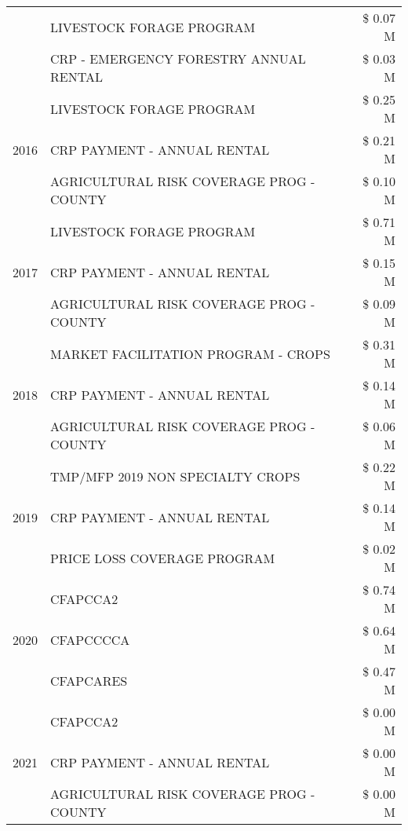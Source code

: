 \begin{tabular}{llr}
 & LIVESTOCK FORAGE PROGRAM & \$ 0.07 M \\
 & CRP - EMERGENCY FORESTRY ANNUAL RENTAL & \$ 0.03 M \\
\cline{1-3}
\multirow[t]{3}{*}{2016} & LIVESTOCK FORAGE PROGRAM & \$ 0.25 M \\
 & CRP PAYMENT - ANNUAL RENTAL & \$ 0.21 M \\
 & AGRICULTURAL RISK COVERAGE PROG - COUNTY & \$ 0.10 M \\
\cline{1-3}
\multirow[t]{3}{*}{2017} & LIVESTOCK FORAGE PROGRAM & \$ 0.71 M \\
 & CRP PAYMENT - ANNUAL RENTAL & \$ 0.15 M \\
 & AGRICULTURAL RISK COVERAGE PROG - COUNTY & \$ 0.09 M \\
\cline{1-3}
\multirow[t]{3}{*}{2018} & MARKET FACILITATION PROGRAM - CROPS & \$ 0.31 M \\
 & CRP PAYMENT - ANNUAL RENTAL & \$ 0.14 M \\
 & AGRICULTURAL RISK COVERAGE PROG - COUNTY & \$ 0.06 M \\
\cline{1-3}
\multirow[t]{3}{*}{2019} & TMP/MFP 2019 NON SPECIALTY CROPS & \$ 0.22 M \\
 & CRP PAYMENT - ANNUAL RENTAL & \$ 0.14 M \\
 & PRICE LOSS COVERAGE PROGRAM & \$ 0.02 M \\
\cline{1-3}
\multirow[t]{3}{*}{2020} & CFAPCCA2 & \$ 0.74 M \\
 & CFAPCCCCA & \$ 0.64 M \\
 & CFAPCARES & \$ 0.47 M \\
\cline{1-3}
\multirow[t]{3}{*}{2021} & CFAPCCA2 & \$ 0.00 M \\
 & CRP PAYMENT - ANNUAL RENTAL & \$ 0.00 M \\
 & AGRICULTURAL RISK COVERAGE PROG - COUNTY & \$ 0.00 M \\
\cline{1-3}
\bottomrule
\end{tabular}
